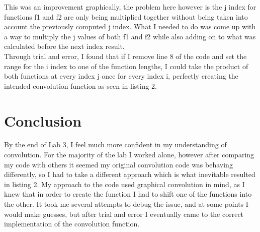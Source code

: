 \documentclass[12pt]{report}
\begin{document}
\hspace{\parindent}This was an improvement graphically, the problem here however is the j index for functions f1 and f2 are only being multiplied together without being taken into account the previously computed j index. What I needed to do was come up with a way to multiply the j values of both f1 and f2 while also adding on to what was calculated before the next index result.\\
\hspace{\parindent}Through trial and error, I found that if I remove line 8 of the code and set the range for the i index to one of the function lengths, I could take the product of both functions at every index j once for every index i, perfectly creating the intended convolution function as seen in listing 2.

\section{Conclusion}
\hspace{\parindent}By the end of Lab 3, I feel much more confident in my understanding of convolution. For the majority of the lab I worked alone, however after comparing my code with others it seemed my original convolution code was behaving differently, so I had to take a different approach which is what inevitable resulted in listing 2. My approach to the code used graphical convolution in mind, as I knew that in order to create the function I had to shift one of the functions into the other. It took me several attempts to debug the issue, and at some points I would make guesses, but after trial and error I eventually came to the correct implementation of the convolution function. 
\end{document}
